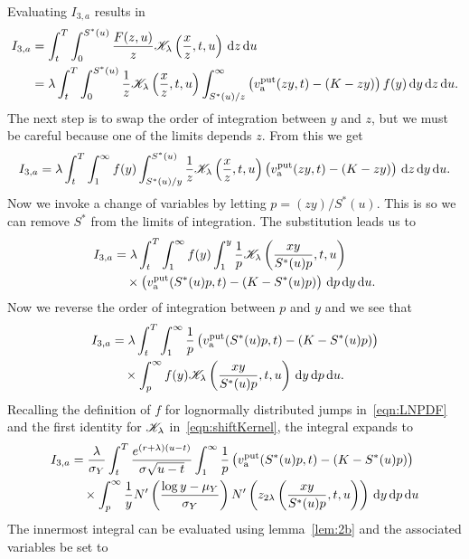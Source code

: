 	Evaluating $I_{3,a}$ results in
		\begin{align*}
			I_{3,a} &= \int_t^T \int_0^{S^*(u)} \frac{F(z,u)}{z}\mathscr K_\lambda\left( \frac{x}{z},t,u \right) \, \mathrm d z \, \mathrm d u \\
			&= \lambda  \int_t^T \int_0^{S^*(u)} \frac{1}{z}\mathscr K_\lambda\left( \frac{x}{z},t,u \right) \int_{S^*(u)/z}^\infty  \left( v_{\text{a}}^{\text{put}}(zy,t) - (K-zy) \right)f(y) \, \mathrm d y \, \mathrm d z \, \mathrm d u.
		\end{align*}
	The next step is to swap the order of integration between $y$ and $z$, but we must be careful because one of the limits depends $z$. From this we get
		$$
			I_{3,a} = \lambda  \int_t^T \int_1^\infty f(y) \int_{S^*(u)/y}^{S^*(u)} \frac{1}{z}\mathscr K_\lambda\left( \frac{x}{z},t,u \right)  \left( v_{\text{a}}^{\text{put}}(zy,t) - (K-zy) \right) \, \mathrm d z \, \mathrm d y \, \mathrm d u.
		$$
	Now we invoke a change of variables by letting $p = (zy)/S^*(u)$. This is so we can remove $S^*$ from the limits of integration. The substitution leads us to
		\begin{align*}
			I_{3,a} &=  \lambda  \int_t^T \int_1^\infty f(y) \int_1^y \frac{1}{p}\mathscr K_\lambda\left( \frac{xy}{S^*(u)p},t,u \right)  \\
			&\quad {} \times \left( v_{\text{a}}^{\text{put}}(S^*(u)p,t) - (K-S^*(u)p) \right) \, \mathrm d p \, \mathrm d y \, \mathrm d u.
		\end{align*}
	Now we reverse the order of integration between $p$ and $y$ and we see that
		\begin{align*}
			I_{3,a} &=  \lambda  \int_t^T \int_1^\infty \frac{1}{p} \left( v_{\text{a}}^{\text{put}}(S^*(u)p,t) - (K-S^*(u)p) \right)  \\
			&\quad {} \times \int_p^\infty f(y)\mathscr K_\lambda\left( \frac{xy}{S^*(u)p},t,u \right) \, \mathrm d y \, \mathrm d p \, \mathrm d u.
		\end{align*}
	Recalling the definition of $f$ for lognormally distributed jumps in~\eqref{eqn:LNPDF} and the first identity for $\mathscr K_\lambda$ in~\eqref{eqn:shiftKernel}, the integral expands to
		\begin{align*}
			I_{3,a} &=  \frac{\lambda}{\sigma_Y}  \int_t^T \frac{e^{(r+\lambda)(u-t)}}{\sigma\sqrt{u-t}} \int_1^\infty \frac{1}{p} \left( v_{\text{a}}^{\text{put}}(S^*(u)p,t) - (K-S^*(u)p) \right)  \\
			&\quad {} \times \int_p^\infty \frac{1}{y}N'\left( \frac{\log y - \mu_Y}{\sigma_Y} \right)N'\left( z_{2\lambda}\left( \frac{xy}{S^*(u)p}, t, u \right)\right) \, \mathrm d y \, \mathrm d p \, \mathrm d u 
		\end{align*}
		The innermost integral can be evaluated using lemma~\ref{lem:2b} and the associated variables be set to
